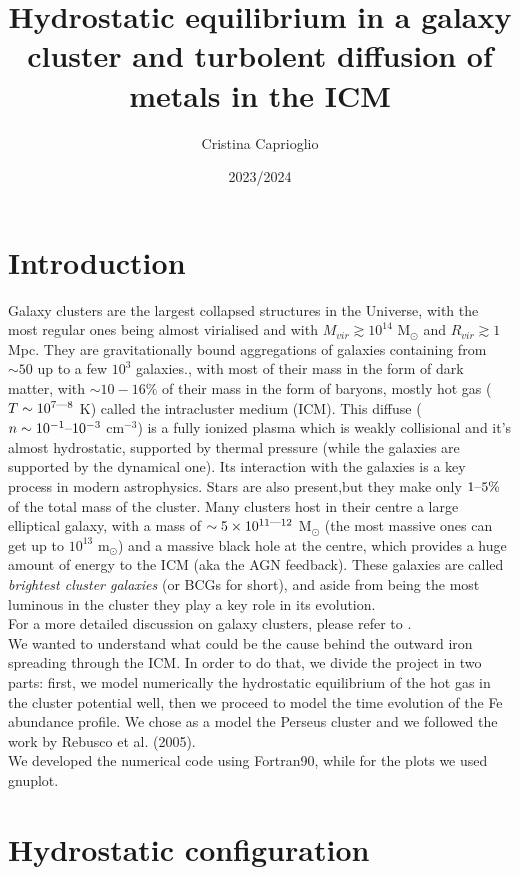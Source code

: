 \documentclass{article}
\title{Hydrostatic equilibrium in a galaxy cluster and turbolent diffusion of metals in the ICM}
\author{Cristina Caprioglio}
\date{2023/2024 }
\begin{document}
\maketitle

\section*{Introduction}
Galaxy clusters are the largest collapsed structures in the Universe, with the most regular ones being almost virialised and with $M_{vir}\gtrsim 10^{14}$ M$_{\odot}$ and $R_{vir}\gtrsim 1$ Mpc. They are gravitationally bound aggregations of galaxies containing from $\sim 50$ up to a few $10^{3}$ galaxies., with most of their mass in the form of dark matter, with $\sim 10-16\%$ of their mass in the form of baryons, mostly hot gas ($T\sim 10^{7\text{\textemdash}8}$ K) called the intracluster medium (ICM). This diffuse ($n\sim 10^{-1}\text{\textendash}10^{-3}$ cm$^{-3}$) is a fully ionized plasma which is weakly collisional and it's almost hydrostatic, supported by thermal pressure (while the galaxies are supported by the dynamical one). 
Its interaction with the galaxies is a key process in modern astrophysics.
Stars are also present,but they make only $1\text{\textendash}5\%$ of the total mass of the cluster. Many clusters host in their centre a large elliptical galaxy, with a mass of $\sim 5\times 10^{11\text{\textemdash}12}$ M$_{\odot}$ (the most massive ones can get up to $10^{13}$ m$_{\odot}$) and a massive black hole at the centre, which provides a huge amount of energy to the ICM (aka the AGN feedback). These galaxies are called \textit{brightest cluster galaxies} (or BCGs for short), and aside from being the most luminous in the cluster they play a key role in its evolution.
\\For a more detailed discussion on galaxy clusters, please refer to \cite[Sec. 6.4]{cimatti}.\\
We wanted to understand what could be the cause behind the outward iron spreading through the ICM. In order to do that, we divide the project in two parts: first, we model numerically the hydrostatic equilibrium of the hot gas in the cluster potential well, then we proceed to model the time evolution of the Fe abundance profile. We chose as a model the Perseus cluster and we followed the work by Rebusco et al. (2005)\cite{rebusco}.\\
We developed the numerical code using Fortran90, while for the plots we used gnuplot. 
\section{Hydrostatic configuration}
\end{document}
